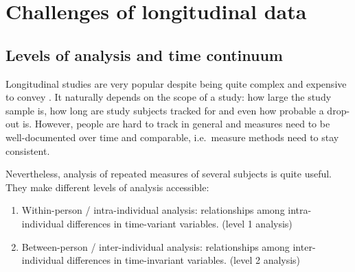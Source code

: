 \documentclass[
  12pt,
]{article}
\newenvironment{Shaded}{\begin{snugshade}}{\end{snugshade}}
\newcommand{\CommentTok}[1]{\textcolor[rgb]{0.56,0.35,0.01}{\textit{#1}}}
\newcommand{\DecValTok}[1]{\textcolor[rgb]{0.00,0.00,0.81}{#1}}
\newcommand{\FunctionTok}[1]{\textcolor[rgb]{0.13,0.29,0.53}{\textbf{#1}}}
\newcommand{\NormalTok}[1]{#1}
\newcommand{\OtherTok}[1]{\textcolor[rgb]{0.56,0.35,0.01}{#1}}
\newcommand{\SpecialCharTok}[1]{\textcolor[rgb]{0.81,0.36,0.00}{\textbf{#1}}}
\begin{document}
\begin{Shaded}
\end{Shaded}

\section{Challenges of longitudinal
data}\label{challenges-of-longitudinal-data}

\subsection{Levels of analysis and time
continuum}\label{levels-of-analysis-and-time-continuum}

Longitudinal studies are very popular despite being quite complex and
expensive to convey \autocite{hoffman_2015}. It naturally depends on the
scope of a study: how large the study sample is, how long are study
subjects tracked for and even how probable a drop-out is. However,
people are hard to track in general and measures need to be
well-documented over time and comparable, i.e.~measure methods need to
stay consistent.

Nevertheless, analysis of repeated measures of several subjects is quite
useful. They make different levels of analysis accessible:

\begin{enumerate}
\def\labelenumi{\arabic{enumi}.}
\item
  Within-person / intra-individual analysis: relationships among
  intra-individual differences in time-variant variables. (level 1
  analysis)
\item
  Between-person / inter-individual analysis: relationships among
  inter-individual differences in time-invariant variables. (level 2
  analysis)
\end{enumerate}
\end{document}
